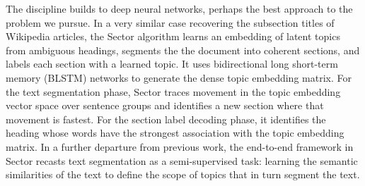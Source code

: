 \documentclass[letterpaper, 12pt]{article}
\begin{document}
The discipline builds to deep neural networks, perhaps the best approach to the problem we pursue. In a very similar case recovering the subsection titles of Wikipedia articles, the Sector algorithm \cite{sebastian-etal-2019-sector} learns an embedding of latent topics from ambiguous headings, segments the the document into coherent sections, and labels each section with a learned topic. It uses bidirectional long short-term memory (BLSTM) networks to generate the dense topic embedding matrix. For the text segmentation phase, Sector traces movement in the topic embedding vector space over sentence groups and identifies a new section where that movement is fastest. For the section label decoding phase, it identifies the heading whose words have the strongest association with the topic embedding matrix. In a further departure from previous work, the end-to-end framework in Sector recasts text segmentation as a semi-supervised task: learning the semantic similarities of the text to define the scope of topics that in turn segment the text.





\end{document}
